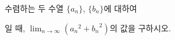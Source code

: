 수렴하는 두 수열 $\{a_n\}$, $\{b_n\}$에 대하여 \par\smallskip{}\par\smallskip\noindent 일 때, $\displaystyle\lim_{n\to\infty}({a_n}^2+{b_n}^2)$의 값을 구하시오.
